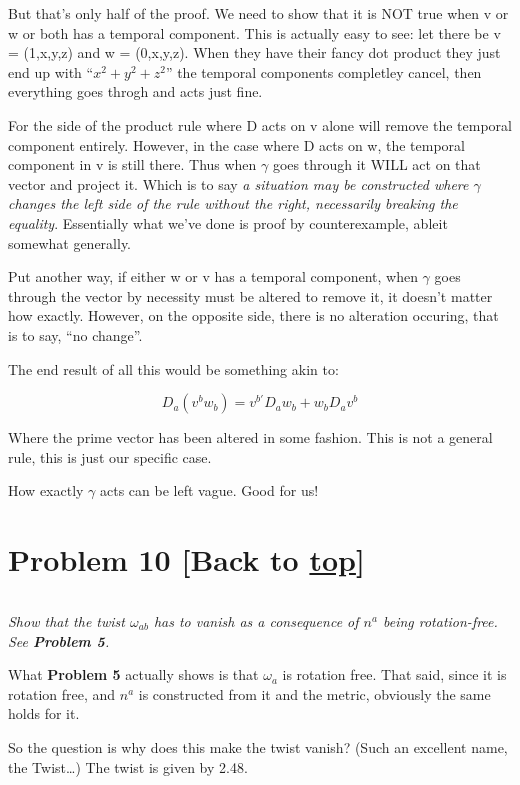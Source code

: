 \documentclass[landscape,letterpaper,10pt,english]{article}
\begin{document}
But that's only half of the proof. We need to show that it is NOT true
when v or w or both has a temporal component. This is actually easy to
see: let there be v = (1,x,y,z) and w = (0,x,y,z). When they have their
fancy dot product they just end up with ``\(x^2+y^2+z^2\)'' the temporal
components completley cancel, then everything goes throgh and acts just
fine.

For the side of the product rule where D acts on v alone will remove the
temporal component entirely. However, in the case where D acts on w, the
temporal component in v is still there. Thus when \(\gamma\) goes
through it WILL act on that vector and project it. Which is to say
\emph{a situation may be constructed where \(\gamma\) changes the left
side of the rule without the right, necessarily breaking the equality}.
Essentially what we've done is proof by counterexample, ableit somewhat
generally.

    Put another way, if either w or v has a temporal component, when
\(\gamma\) goes through the vector by necessity must be altered to
remove it, it doesn't matter how exactly. However, on the opposite side,
there is no alteration occuring, that is to say, ``no change''.

The end result of all this would be something akin to:

\[D_a(v^bw_b) = v^{b '} D_aw_b + w_bD_av^b\]

Where the prime vector has been altered in some fashion. This is not a
general rule, this is just our specific case.

How exactly \(\gamma\) acts can be left vague. Good for us!

    \hypertarget{problem-10-back-to-top}{%
\section{\texorpdfstring{Problem 10 {[}Back to
\hyperref[toc]{top}{]}}{Problem 10 {[}Back to {]}}}\label{problem-10-back-to-top}}

\[\label{P10}\]

\emph{Show that the twist \(\omega_{ab}\) has to vanish as a consequence
of \(n^a\) being rotation-free. See \textbf{Problem 5}.}

    What \textbf{Problem 5} actually shows is that \(\omega_a\) is rotation
free. That said, since it is rotation free, and \(n^a\) is constructed
from it and the metric, obviously the same holds for it.

So the question is why does this make the twist vanish? (Such an
excellent name, the Twist\ldots) The twist is given by 2.48.
\end{document}
